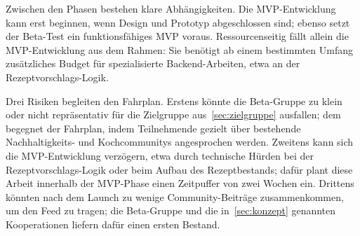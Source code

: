 Zwischen den Phasen bestehen klare Abhängigkeiten. Die \ac{MVP}-Entwicklung kann erst beginnen, wenn Design und Prototyp abgeschlossen sind; ebenso setzt der Beta-Test ein funktionsfähiges \ac{MVP} voraus. Ressourcenseitig fällt allein die \ac{MVP}-Entwicklung aus dem Rahmen: Sie benötigt ab einem bestimmten Umfang zusätzliches Budget für spezialisierte Backend-Arbeiten, etwa an der Rezeptvorschlags-Logik.

Drei Risiken begleiten den Fahrplan. Erstens könnte die Beta-Gruppe zu klein oder nicht repräsentativ für die Zielgruppe aus~\autoref{sec:zielgruppe} ausfallen; dem begegnet der Fahrplan, indem Teilnehmende gezielt über bestehende Nachhaltigkeits- und Kochcommunitys angesprochen werden. Zweitens kann sich die \ac{MVP}-Entwicklung verzögern, etwa durch technische Hürden bei der Rezeptvorschlags-Logik oder beim Aufbau des Rezeptbestands; dafür plant diese Arbeit innerhalb der \ac{MVP}-Phase einen Zeitpuffer von zwei Wochen ein. Drittens könnten nach dem Launch zu wenige Community-Beiträge zusammenkommen, um den Feed zu tragen; die Beta-Gruppe und die in~\autoref{sec:konzept} genannten Kooperationen liefern dafür einen ersten Bestand.
